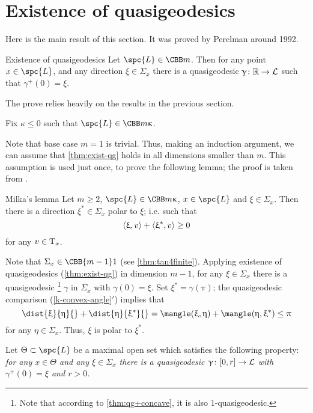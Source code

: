 \endclaim\rm






\section{Existence of quasigeodesics}\label{step3-1}

Here is the main result of this section.
It was proved by Perelman around 1992.


\begin{thm}{Existence of quasigeodesics}\label{thm:exist-qg}
Let $\spc{L}\in\CBB m{}$. 
Then for any point $x\in \spc{L}$, and any direction $\xi\in \Sigma_x$
there is a quasigeodesic $\gamma\:\RR\to \spc{L}$ such that 
$\gamma^+(0)=\xi$.
\end{thm}

The prove relies heavily on the results in the previous section.

Fix $\kappa\le0$ such that $\spc{L}\in\CBB m\kappa$.

Note that base case $m=1$ is trivial.
Thus, making an induction argument, we can assume that \ref{thm:exist-qg} holds in all dimensions smaller than $m$.
This assumption is used just once, to prove the following lemma;
the proof is taken from \cite{milka:poly1}.

\begin{thm}{Milka's lemma}\label{lem-milka}
\label{lem:milka}
Let $m\ge 2$, 
$\spc{L}\in\CBB m\kappa$, 
$x\in \spc{L}$ 
and $\xi\in \Sigma_x$.
Then there is a direction $\xi^*\in\Sigma_x$ polar to $\xi$; 
i.e. such that
\[\<\xi,v\>+\<\xi^*,v\>\ge 0\]
for any $v\in \T_x$.
\end{thm}


 Note that $\Sigma_x\in\CBB{m-1}1$ (see \ref{thm:tan4finite}). 
Applying  existence  of quasigeodesics (\ref{thm:exist-qg}) in dimension $m-1$,
for any 
$\xi\in \Sigma_x$ there is a quasigeodesic%
\footnote{Note that according to \ref{thm:qg+concave}, it is also $1$-quasigeodesic.}
 $\gamma$ in $\Sigma_x$ with $\gamma(0)=\xi$.
Set $\xi^*=\gamma(\pi)$;
the quasigeodesic comparison (\ref{k-convex-angle}$'$) implies that
\[\dist{\xi}{\eta}{}+\dist{\eta}{\xi^*}{}
=
\mangle(\xi,\eta)+\mangle(\eta,\xi^*)\leq\pi\] 
for any $\eta\in \Sigma_x$.
Thus, $\xi$ is polar to $\xi^*$.
\qeds




Let $\Theta\subset \spc{L}$ be a maximal open set which satisfies the following property:
\textit{for any $x\in \Theta$ and any $\xi\in\Sigma_x$ there is a quasigeodesic $\gamma\:[0,r]\to \spc{L}$ with $\gamma^+(0)=\xi$ and $r>0$.}

